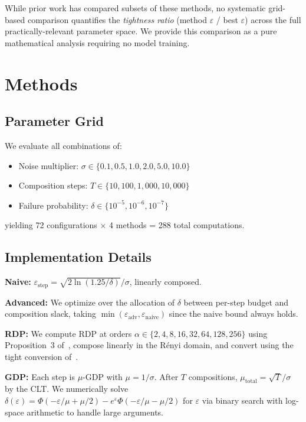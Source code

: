 \documentclass[11pt,a4paper]{article}
\begin{document}
While prior work has compared subsets of these methods, no systematic grid-based comparison quantifies the \emph{tightness ratio} (method $\varepsilon$ / best $\varepsilon$) across the full practically-relevant parameter space. We provide this comparison as a pure mathematical analysis requiring no model training.

\section{Methods}

\subsection{Parameter Grid}
We evaluate all combinations of:
\begin{itemize}[nosep]
    \item Noise multiplier: $\sigma \in \{0.1, 0.5, 1.0, 2.0, 5.0, 10.0\}$
    \item Composition steps: $T \in \{10, 100, 1{,}000, 10{,}000\}$
    \item Failure probability: $\delta \in \{10^{-5}, 10^{-6}, 10^{-7}\}$
\end{itemize}
yielding 72 configurations $\times$ 4 methods = 288 total computations.

\subsection{Implementation Details}
\textbf{Naive:} $\varepsilon_{\text{step}} = \sqrt{2\ln(1.25/\delta)}/\sigma$, linearly composed.

\textbf{Advanced:} We optimize over the allocation of $\delta$ between per-step budget and composition slack, taking $\min(\varepsilon_{\text{adv}}, \varepsilon_{\text{naive}})$ since the naive bound always holds.

\textbf{RDP:} We compute RDP at orders $\alpha \in \{2, 4, 8, 16, 32, 64, 128, 256\}$ using Proposition~3 of~\cite{mironov2017renyi}, compose linearly in the R\'enyi domain, and convert using the tight conversion of~\cite{balle2020hypothesis}.

\textbf{GDP:} Each step is $\mu$-GDP with $\mu = 1/\sigma$. After $T$ compositions, $\mu_{\text{total}} = \sqrt{T}/\sigma$ by the CLT. We numerically solve $\delta(\varepsilon) = \Phi(-\varepsilon/\mu + \mu/2) - e^{\varepsilon}\Phi(-\varepsilon/\mu - \mu/2)$ for $\varepsilon$ via binary search with log-space arithmetic to handle large arguments.
\end{document}
